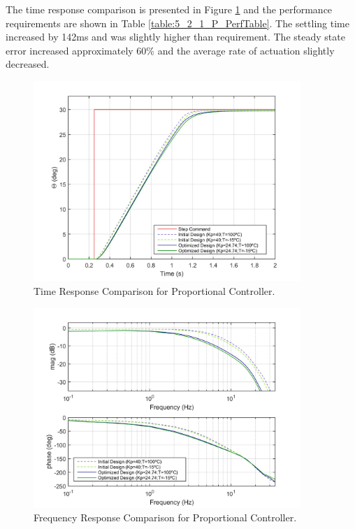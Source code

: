 The time response comparison is presented in Figure \ref{fig:5_2_1_P_TimeResp} and the performance requirements are shown in Table \ref{table:5_2_1_P_PerfTable}. The settling time increased by 142ms and was slightly higher than requirement. The steady state error increased approximately 60\% and the average rate of actuation slightly decreased. 

\begin{figure}[H]
	\centering
	\centerline{\includegraphics[width=0.9\textwidth]{Figuras/5.OptimizationResults/5-2-1-P-TimeResponseComparison.jpg}}
	\caption{Time Response Comparison for Proportional Controller.}
	\label{fig:5_2_1_P_TimeResp}
\end{figure}

\begin{figure}[H]
	\centering
	\centerline{\includegraphics[width=0.9\textwidth]{Figuras/5.OptimizationResults/5-2-1-P-FrequencyResponseComparison.jpg}}
	\caption{Frequency Response Comparison for Proportional Controller.}
	\label{fig:5_2_1_P_FreqResp}
\end{figure}


